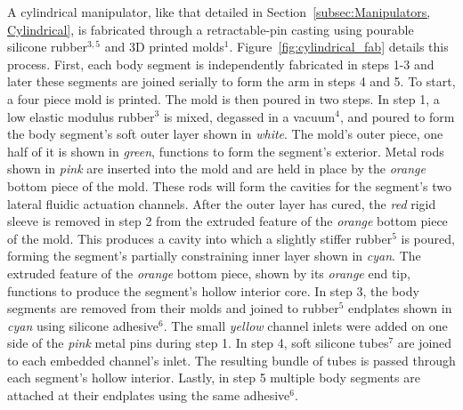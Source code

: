 A cylindrical manipulator, like that detailed in Section~\ref{subsec:Manipulators, Cylindrical}, is fabricated through a retractable-pin casting using pourable silicone rubber$^{3,5}$ and 3D printed molds$^1$.
Figure~\ref{fig:cylindrical_fab} details this process.
First, each body segment is independently fabricated in steps 1-3 and later these segments are joined serially to form the arm in steps 4 and 5.
To start, a four piece mold is printed.
The mold is then poured in two steps.
In step 1, a low elastic modulus rubber$^3$ is mixed, degassed in a vacuum$^4$, and poured to form the body segment's soft outer layer shown in \emph{white}.
The mold's outer piece, one half of it is shown in \emph{green}, functions to form the segment's exterior.
Metal rods shown in \emph{pink} are inserted into the mold and are held in place by the \emph{orange} bottom piece of the mold.
These rods will form the cavities for the segment's two lateral fluidic actuation channels.
After the outer layer has cured, the \emph{red} rigid sleeve is removed in step 2 from the extruded feature of the \emph{orange} bottom piece of the mold.
This produces a cavity into which a slightly stiffer rubber$^5$ is poured, forming the segment's partially constraining inner layer shown in \emph{cyan}.
The extruded feature of the \emph{orange} bottom piece, shown by its \emph{orange} end tip, functions to produce the segment's hollow interior core.
In step 3, the body segments are removed from their molds and joined to rubber$^5$ endplates shown in \emph{cyan} using silicone adhesive$^6$.
The small \emph{yellow} channel inlets were added on one side of the \emph{pink} metal pins during step 1.
In step 4, soft silicone tubes$^7$ are joined to each embedded channel's inlet.
The resulting bundle of tubes is passed through each segment's hollow interior.
Lastly, in step 5 multiple body segments are attached at their endplates using the same adhesive$^6$.

